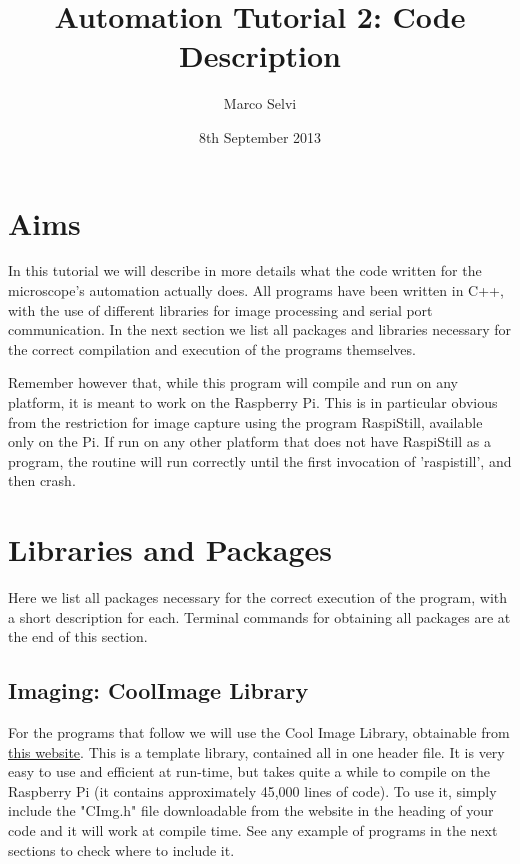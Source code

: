 \documentclass[a4paper]{article}
\begin{document}
	
	\title{Automation Tutorial 2: Code Description}
	\date{8th September 2013}
	\author{Marco Selvi}
	\maketitle
	
	
	\section*{Aims}
	
		In this tutorial we will describe in more details what the code written for the microscope's automation actually does.
		All programs have been written in C++, with the use of different libraries for image processing and serial port communication.
		In the next section we list all packages and libraries necessary for the correct compilation and execution of the programs themselves.
		
		Remember however that, while this program will compile and run on any platform, it is meant to work on the Raspberry Pi.
		This is in particular obvious from the restriction for image capture using the program RaspiStill, available only on the Pi.
		If run on any other platform that does not have RaspiStill as a program, the routine will run correctly until the first invocation of 'raspistill', and then crash.
	
	\section*{Libraries and Packages}
	
		Here we list all packages necessary for the correct execution of the program, with a short description for each.
		Terminal commands for obtaining all packages are at the end of this section.
	 
	\subsection*{Imaging: CoolImage Library}
	
			For the programs that follow we will use the Cool Image Library, obtainable from \href{http://cimg.sourceforge.net/}{this website}.
			This is a template library, contained all in one header file.
			It is very easy to use and efficient at run-time, but takes quite a while to compile on the Raspberry Pi (it contains approximately 45,000 lines of code).
			To use it, simply include the "CImg.h" file downloadable from the website in the heading of your code and it will work at compile time. 
			See any example of programs in the next sections to check where to include it.
			
\end{document}
